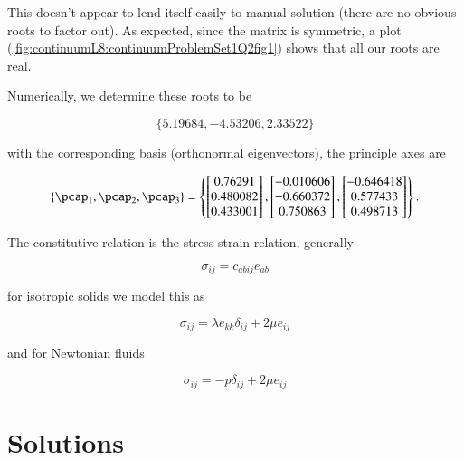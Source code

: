 \begin{Answer}[ref={problem:strain:ps1q2a}]
This doesn't appear to lend itself easily to manual solution (there are no obvious roots to factor out).  As expected, since the matrix is symmetric, a plot (\ref{fig:continuumL8:continuumProblemSet1Q2fig1}) shows that all our roots are real.


Numerically, we determine these roots to be

\begin{equation}\label{eqn:continuumProblemSet1:310}
\{5.19684, -4.53206, 2.33522\}
\end{equation}

with the corresponding basis (orthonormal eigenvectors), the principle axes are

\begin{equation}\label{eqn:continuumProblemSet1:330}
\left\{
\pcap_1,
\pcap_2,
\pcap_3
\right\}
=
\left\{
\begin{bmatrix}
0.76291 \\
0.480082 \\
0.433001
\end{bmatrix},
\begin{bmatrix}
-0.010606 \\
-0.660372 \\
0.750863
\end{bmatrix},
\begin{bmatrix}
-0.646418 \\
0.577433 \\
0.498713
\end{bmatrix}
\right\}.
\end{equation}

\end{Answer}

\begin{Exercise}[
title={What is meant by \textit{constitutive relation}?},
label={problem:fluids:midterm:1b}
]
\end{Exercise}

\begin{Answer}[ref={problem:fluids:midterm:1b}]
The constitutive relation is the stress-strain relation, generally

\begin{equation}\label{eqn:continuumMidTermReflection:150}
\sigma_{ij} = c_{abij} e_{ab}
\end{equation}

for isotropic solids we model this as 

\begin{equation}\label{eqn:continuumMidTermReflection:170}
\sigma_{ij} = \lambda e_{kk} \delta_{ij} + 2 \mu e_{ij}
\end{equation}

and for Newtonian fluids

\begin{equation}\label{eqn:continuumMidTermReflection:190}
\sigma_{ij} = -p \delta_{ij} + 2 \mu e_{ij}
\end{equation}
\end{Answer}

\section{Solutions}

\shipoutAnswer
